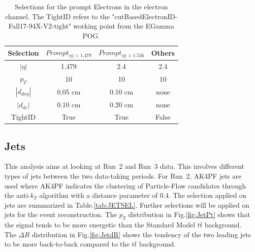 \documentclass{cernatlasnote}
\begin{document}
\begin{table}[h]
\centering
\begin{tabular}{|c|c|c|c|}
  \hline
  \rowcolor{lightgray} 
  Selection & $Prompt_{|\eta|<1.479}$ & $Prompt_{|\eta|> 1.556}$ & Others \\
  \hline
  $|\eta|$ & 1.479 & 2.4 & 2.4 \\
  $p_T$ & 10 & 10 & 10\\
  $|d_{dxy}|$ & 0.05 cm  & 0.10 cm & none\\
  $|d_{dz}|$ & 0.10 cm & 0.20 cm & none\\
  TightID & True & True & False\\
  \hline
\end{tabular}
    \caption{Selections for the prompt Electrons in the electron channel. The TightID refers to the "cutBasedElectronID-Fall17-94X-V2-tight" working point from the EGamma POG.}
    \label{tab:ELSEL}
\end{table}

\subsection{Jets}
\label{SUB:JETS}

This analysis aims at looking at Run~2 and Run~3 data. This involves different types of jets between the two data-taking periods. For Run~2, AK4PF jets are used where AK4PF indicates the clustering of Particle-Flow candidates through the anti-$k_T$ algorithm \cite{ANTIKT} with a distance parameter of 0.4. The selection applied on jets are summarized in Table.\ref{tab:JETSEL}. Further selections will be applied on jets for the event reconstruction. The $p_T$  distribution in Fig.\ref{fig:JetPt} shows that the signal tends to be more energetic than the Standard Model $t\bar{t}$ background. The $\Delta R$   distribution in Fig.\ref{fig:JetdR} shows the tendency of the two leading jets to be more back-to-back compared to the $t\bar{t}$ background.
\end{document}
